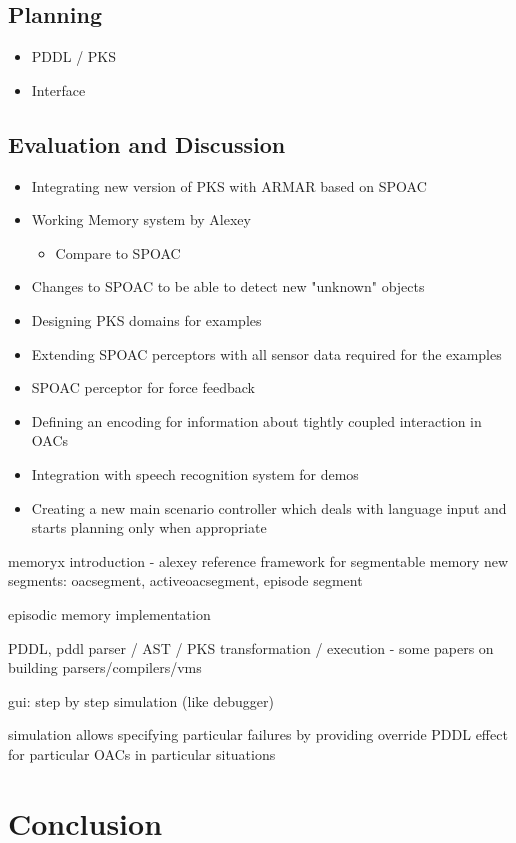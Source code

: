 \documentclass[english,ngerman]{KITreprt}
\begin{document}
\section{Planning}
\begin{itemize}
    \item PDDL / PKS
    \item Interface
\end{itemize}

\section{Evaluation and Discussion}

\begin{itemize}
    \item Integrating new version of PKS with ARMAR based on SPOAC
    \item Working Memory system by Alexey
        \begin{itemize}
            \item Compare to SPOAC
        \end{itemize}
    \item Changes to SPOAC to be able to detect new "unknown" objects
    \item Designing PKS domains for examples
    \item Extending SPOAC perceptors with all sensor data required for the examples
    \item SPOAC perceptor for force feedback
    \item Defining an encoding for information about tightly coupled interaction in OACs
    \item Integration with speech recognition system for demos
    \item Creating a new main scenario controller which deals with language input and
        starts planning only when appropriate
\end{itemize}

memoryx introduction - alexey reference
framework for segmentable memory
new segments: oacsegment, activeoacsegment, episode segment

episodic memory implementation

PDDL, pddl parser / AST / PKS transformation / execution - some papers on building parsers/compilers/vms

gui: step by step simulation (like debugger)

simulation allows specifying particular failures by providing override PDDL effect for particular OACs in particular situations

\chapter{Conclusion}





\end{document}
